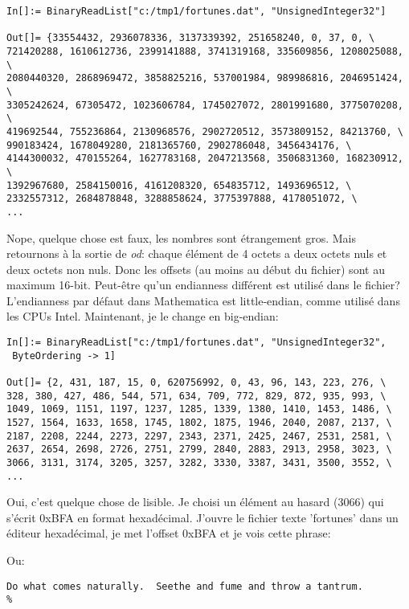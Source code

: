 \begin{lstlisting}[style=custommath]
In[]:= BinaryReadList["c:/tmp1/fortunes.dat", "UnsignedInteger32"]

Out[]= {33554432, 2936078336, 3137339392, 251658240, 0, 37, 0, \
721420288, 1610612736, 2399141888, 3741319168, 335609856, 1208025088, \
2080440320, 2868969472, 3858825216, 537001984, 989986816, 2046951424, \
3305242624, 67305472, 1023606784, 1745027072, 2801991680, 3775070208, \
419692544, 755236864, 2130968576, 2902720512, 3573809152, 84213760, \
990183424, 1678049280, 2181365760, 2902786048, 3456434176, \
4144300032, 470155264, 1627783168, 2047213568, 3506831360, 168230912, \
1392967680, 2584150016, 4161208320, 654835712, 1493696512, \
2332557312, 2684878848, 3288858624, 3775397888, 4178051072, \
...
\end{lstlisting}

Nope, quelque chose est faux, les nombres sont étrangement gros.
Mais retournons à la sortie de \emph{od}: chaque élément de 4 octets a deux octets nuls
et deux octets non nuls.
Donc les offsets (au moins au début du fichier) sont au maximum 16-bit.
Peut-être qu'un endianness différent est utilisé dans le fichier?
L'endianness par défaut dans Mathematica est little-endian, comme utilisé dans les
CPUs Intel.
Maintenant, je le change en big-endian:

\begin{lstlisting}[style=custommath]
In[]:= BinaryReadList["c:/tmp1/fortunes.dat", "UnsignedInteger32", 
 ByteOrdering -> 1]

Out[]= {2, 431, 187, 15, 0, 620756992, 0, 43, 96, 143, 223, 276, \
328, 380, 427, 486, 544, 571, 634, 709, 772, 829, 872, 935, 993, \
1049, 1069, 1151, 1197, 1237, 1285, 1339, 1380, 1410, 1453, 1486, \
1527, 1564, 1633, 1658, 1745, 1802, 1875, 1946, 2040, 2087, 2137, \
2187, 2208, 2244, 2273, 2297, 2343, 2371, 2425, 2467, 2531, 2581, \
2637, 2654, 2698, 2726, 2751, 2799, 2840, 2883, 2913, 2958, 3023, \
3066, 3131, 3174, 3205, 3257, 3282, 3330, 3387, 3431, 3500, 3552, \
...
\end{lstlisting}

Oui, c'est quelque chose de lisible.
Je choisi un élément au hasard (3066) qui s'écrit 0xBFA en format hexadécimal.
J'ouvre le fichier texte 'fortunes' dans un éditeur hexadécimal, je met l'offset
0xBFA et je vois cette phrase:



Ou:

\begin{lstlisting}
Do what comes naturally.  Seethe and fume and throw a tantrum.
%
\end{lstlisting}

